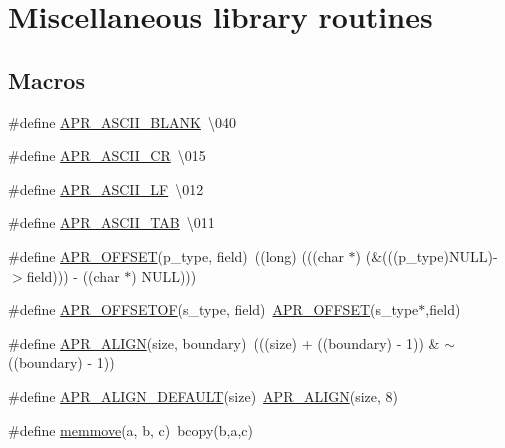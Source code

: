 \hypertarget{group__apr__general}{}\section{Miscellaneous library routines}
\label{group__apr__general}
\subsection*{Macros}
\begin{DoxyCompactItemize}
\item 
\#define \mbox{\hyperlink{group__apr__general_ga60fc208d93123acc7cf915a66e49e654}{A\+P\+R\+\_\+\+A\+S\+C\+I\+I\+\_\+\+B\+L\+A\+NK}}~\textquotesingle{}\textbackslash{}040\textquotesingle{}
\item 
\#define \mbox{\hyperlink{group__apr__general_ga91c14ef7f03e82c07f4d3d56f63f8b6a}{A\+P\+R\+\_\+\+A\+S\+C\+I\+I\+\_\+\+CR}}~\textquotesingle{}\textbackslash{}015\textquotesingle{}
\item 
\#define \mbox{\hyperlink{group__apr__general_ga9e76601cef56a7a5b25f73fe6d57d7d9}{A\+P\+R\+\_\+\+A\+S\+C\+I\+I\+\_\+\+LF}}~\textquotesingle{}\textbackslash{}012\textquotesingle{}
\item 
\#define \mbox{\hyperlink{group__apr__general_gac7162c0b5d026a0717aaa98bf581349d}{A\+P\+R\+\_\+\+A\+S\+C\+I\+I\+\_\+\+T\+AB}}~\textquotesingle{}\textbackslash{}011\textquotesingle{}
\item 
\#define \mbox{\hyperlink{group__apr__general_ga41e537d6ad732766d12cd4eb61531678}{A\+P\+R\+\_\+\+O\+F\+F\+S\+ET}}(p\+\_\+type,  field)~((long) (((char $\ast$) (\&(((p\+\_\+type)N\+U\+LL)-\/$>$field))) -\/ ((char $\ast$) N\+U\+LL)))
\item 
\#define \mbox{\hyperlink{group__apr__general_gac16b1187b6ea63706c5dd48c88323dec}{A\+P\+R\+\_\+\+O\+F\+F\+S\+E\+T\+OF}}(s\+\_\+type,  field)~\mbox{\hyperlink{group__apr__general_ga41e537d6ad732766d12cd4eb61531678}{A\+P\+R\+\_\+\+O\+F\+F\+S\+ET}}(s\+\_\+type$\ast$,field)
\item 
\#define \mbox{\hyperlink{group__apr__general_ga3c4f50d14ebe7a6add282d879521d552}{A\+P\+R\+\_\+\+A\+L\+I\+GN}}(size,  boundary)~(((size) + ((boundary) -\/ 1)) \& $\sim$((boundary) -\/ 1))
\item 
\#define \mbox{\hyperlink{group__apr__general_gab484e98426221f3212fcb67af0467381}{A\+P\+R\+\_\+\+A\+L\+I\+G\+N\+\_\+\+D\+E\+F\+A\+U\+LT}}(size)~\mbox{\hyperlink{group__apr__general_ga3c4f50d14ebe7a6add282d879521d552}{A\+P\+R\+\_\+\+A\+L\+I\+GN}}(size, 8)
\item 
\#define \mbox{\hyperlink{group__apr__general_gad12df83f1d3a090b658adc645555ca79}{memmove}}(a,  b,  c)~bcopy(b,a,c)
\end{DoxyCompactItemize}
